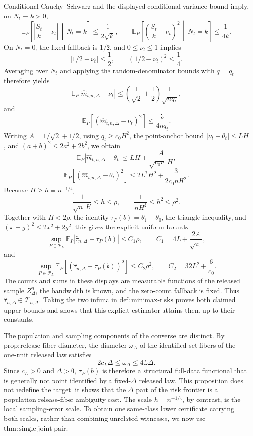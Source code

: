 Conditional Cauchy--Schwarz and the displayed conditional variance bound imply, on \(N_t=k>0\),
\[
 \mathbb E_P\!\left[\left|\frac{S_t}{k}-\nu_t\right|\,\middle|\,N_t=k\right]
 \leq\frac1{2\sqrt k},
 \qquad
 \mathbb E_P\!\left[\left(\frac{S_t}{k}-\nu_t\right)^2\,\middle|\,N_t=k\right]
 \leq\frac1{4k}.
\]
On \(N_t=0\), the fixed fallback is \(1/2\), and \(0\leq\nu_t\leq1\) implies
\[
 |1/2-\nu_t|\leq\frac12,
 \qquad (1/2-\nu_t)^2\leq\frac14.
\]
Averaging over \(N_t\) and applying the random-denominator bounds with \(q=q_t\) therefore yields
\[
 \mathbb E_P|\widehat m_{t,n,\Delta}-\nu_t|
 \leq\left(\frac1{\sqrt2}+\frac12\right)\frac1{\sqrt{nq_t}},
\]
and
\[
 \mathbb E_P[(\widehat m_{t,n,\Delta}-\nu_t)^2]
 \leq\frac3{4nq_t}.
\]
Writing \(A=1/\sqrt2+1/2\), using \(q_t\geq c_0H^2\), the point-anchor bound \(|\nu_t-\theta_t|\leq LH\), and \((a+b)^2\leq2a^2+2b^2\), we obtain
\[
 \mathbb E_P|\widehat m_{t,n,\Delta}-\theta_t|
 \leq LH+\frac{A}{\sqrt{c_0n}\,H},
\]
\[
 \mathbb E_P[(\widehat m_{t,n,\Delta}-\theta_t)^2]
 \leq2L^2H^2+\frac3{2c_0nH^2}.
\]
Because \(H\geq h=n^{-1/4}\),
\[
 \frac1{\sqrt n\,H}\leq h\leq\rho,
 \qquad
 \frac1{nH^2}\leq h^2\leq\rho^2.
\]
Together with \(H<2\rho\), the identity \(\tau_P(b)=\theta_1-\theta_0\), the triangle inequality, and \((x-y)^2\leq2x^2+2y^2\), this gives the explicit uniform bounds
\[
 \sup_{P\in\mathcal P_L}
 \mathbb E_P|\widehat\tau_{n,\Delta}-\tau_P(b)|
 \leq C_1\rho,
 \qquad
 C_1=4L+\frac{2A}{\sqrt{c_0}},
\]
and
\[
 \sup_{P\in\mathcal P_L}
 \mathbb E_P[(\widehat\tau_{n,\Delta}-\tau_P(b))^2]
 \leq C_2\rho^2,
 \qquad
 C_2=32L^2+\frac6{c_0}.
\]
The counts and sums in these displays are measurable functions of the released sample \(Z_\Delta^n\), the bandwidth is known, and the zero-count fallback is fixed.  Thus \(\widehat\tau_{n,\Delta}\in\mathcal T_{n,\Delta}\).  Taking the two infima in \(\mathrm{def:minimax\text{-}risks}\) proves both claimed upper bounds and shows that this explicit estimator attains them up to their constants.

The population and sampling components of the converse are distinct.  By \(\mathrm{prop:release\text{-}fiber\text{-}diameter}\), the diameter \(\omega_\Delta\) of the identified-set fibers of the one-unit released law satisfies
\[
 2c_L\Delta\leq\omega_\Delta\leq4L\Delta.
\]
Since \(c_L>0\) and \(\Delta>0\), \(\tau_P(b)\) is therefore a structural full-data functional that is generally not point identified by a fixed-\(\Delta\) released law.  This proposition does not redefine the target: it shows that the \(\Delta\) part of the risk frontier is a population release-fiber ambiguity cost.  The scale \(h=n^{-1/4}\), by contrast, is the local sampling-error scale.  To obtain one same-class lower certificate carrying both scales, rather than combining unrelated witnesses, we now use \(\mathrm{thm:single\text{-}joint\text{-}pair}\).

